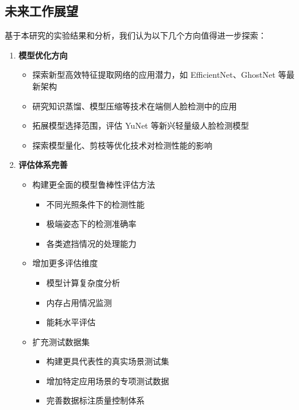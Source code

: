 \documentclass{article}
\begin{document}
\subsection{未来工作展望}

基于本研究的实验结果和分析，我们认为以下几个方向值得进一步探索：

\begin{enumerate}
    \item \textbf{模型优化方向}
    \begin{itemize}
        \item 探索新型高效特征提取网络的应用潜力，如 EfficientNet、GhostNet 等最新架构
        \item 研究知识蒸馏、模型压缩等技术在端侧人脸检测中的应用
        \item 拓展模型选择范围，评估 YuNet 等新兴轻量级人脸检测模型
        \item 探索模型量化、剪枝等优化技术对检测性能的影响
    \end{itemize}

    \item \textbf{评估体系完善}
    \begin{itemize}
        \item 构建更全面的模型鲁棒性评估方法
        \begin{itemize}
            \item 不同光照条件下的检测性能
            \item 极端姿态下的检测准确率
            \item 各类遮挡情况的处理能力
        \end{itemize}
        \item 增加更多评估维度
        \begin{itemize}
            \item 模型计算复杂度分析
            \item 内存占用情况监测
            \item 能耗水平评估
        \end{itemize}
        \item 扩充测试数据集
        \begin{itemize}
            \item 构建更具代表性的真实场景测试集
            \item 增加特定应用场景的专项测试数据
            \item 完善数据标注质量控制体系
        \end{itemize}
    \end{itemize}


\end{enumerate}
\end{document}
